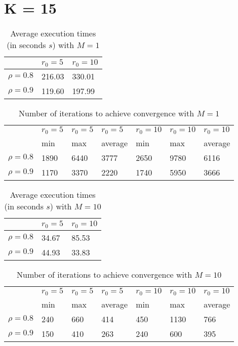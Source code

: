 \documentclass[a4paper,11pt,openright]{report}
\begin{document}
\section*{K = 15}
\begin{table}[H]
\centering
\addtolength{\leftskip}{-1.5cm}
\addtolength{\rightskip}{-1.5cm}
\begin{tabular}{|c|ll|}
\hline
$ $ & $r_0 = 5$ & $r_0 = 10$ \\
\hline
$\rho = 0.8$ & 216.03 & 330.01 \\
$\rho = 0.9$ & 119.60 & 197.99 \\
\hline
\end{tabular}
\caption{Average execution times (in seconds $s$) with $M = 1$}
\end{table}
\begin{table}[H]
\centering
\addtolength{\leftskip}{-1.5cm}
\addtolength{\rightskip}{-1.5cm}
\begin{tabular}{|c|llllll|}
\hline
$ $ & $r_0 = 5$ & $r_0 = 5$ & $r_0 = 5$ & $r_0 = 10$ & $r_0 = 10$ & $r_0 = 10$ \\
$ $ & min & max & average & min & max & average \\
\hline
$\rho = 0.8$ & 1890 & 6440 & 3777 & 2650 & 9780 & 6116 \\
$\rho = 0.9$ & 1170 & 3370 & 2220 & 1740 & 5950 & 3666 \\
\hline
\end{tabular}
\caption{Number of iterations to achieve convergence with $M = 1$}
\end{table}
\begin{table}[H]
\centering
\addtolength{\leftskip}{-1.5cm}
\addtolength{\rightskip}{-1.5cm}
\begin{tabular}{|c|ll|}
\hline
$ $ & $r_0 = 5$ & $r_0 = 10$ \\
\hline
$\rho = 0.8$ & 34.67 & 85.53 \\
$\rho = 0.9$ & 44.93 & 33.83 \\
\hline
\end{tabular}
\caption{Average execution times (in seconds $s$) with $M = 10$}
\end{table}
\begin{table}[H]
\centering
\addtolength{\leftskip}{-1.5cm}
\addtolength{\rightskip}{-1.5cm}
\begin{tabular}{|c|llllll|}
\hline
$ $ & $r_0 = 5$ & $r_0 = 5$ & $r_0 = 5$ & $r_0 = 10$ & $r_0 = 10$ & $r_0 = 10$ \\
$ $ & min & max & average & min & max & average \\
\hline
$\rho = 0.8$ & 240 & 660 & 414 & 450 & 1130 & 766 \\
$\rho = 0.9$ & 150 & 410 & 263 & 240 & 600 & 395 \\
\hline
\end{tabular}
\caption{Number of iterations to achieve convergence with $M = 10$}
\end{table}
\end{document}
